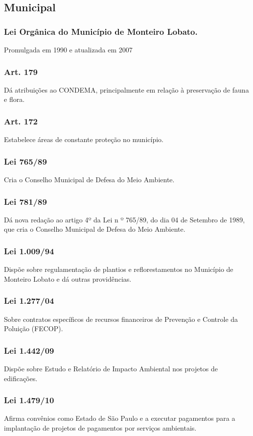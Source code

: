 \begin{subapend}
	\subsection{Municipal}
	\begin{subsubapend}
		\item \subsubsection{Lei Orgânica do Município de Monteiro Lobato.} 
		Promulgada em 1990 e atualizada em 2007
		\subsubsection{Art. 179}
		Dá atribuições ao CONDEMA, principalmente em relação à preservação de fauna e flora.
		\subsubsection{Art. 172}
		Estabelece áreas de constante proteção no município.
		\subsubsection{Lei 765/89}
		Cria o Conselho Municipal de Defesa do Meio Ambiente.
		\subsubsection{Lei 781/89}
		Dá nova redação ao artigo 4º da Lei n º 765/89, do dia 04 de Setembro de 1989, que cria o Conselho Municipal de Defesa do Meio Ambiente.
		\subsubsection{Lei 1.009/94}
		Dispõe sobre regulamentação de plantios e reflorestamentos no Município de Monteiro Lobato e dá outras providências.
		\subsubsection{Lei 1.277/04}
		Sobre contratos específicos de recursos financeiros de Prevenção e Controle da Poluição (FECOP).
		\subsubsection{Lei 1.442/09}
		Dispõe sobre Estudo e Relatório de Impacto Ambiental nos projetos de edificações.
		\subsubsection{Lei 1.479/10}
		Afirma convênios como Estado de São Paulo e a executar pagamentos para a implantação de projetos de pagamentos por serviços ambientais.

\end{subsubapend}
\end{subapend}
